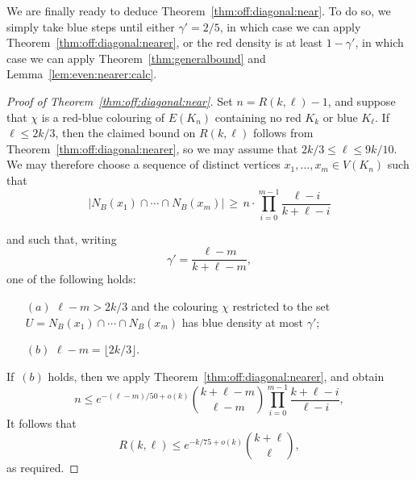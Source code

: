 \documentclass[12pt,reqno]{amsart}
\theoremstyle{definition}
\theoremstyle{remark}
\renewcommand{\le}{\leqslant}
\renewcommand{\ge}{\geqslant}
\begin{document}
We are finally ready to deduce Theorem~\ref{thm:off:diagonal:near}. To do so, we simply take blue steps until either $\gamma' = 2/5$, in which case we can apply Theorem~\ref{thm:off:diagonal:nearer}, or the red density is at least $1 - \gamma'$, in which case we can apply Theorem~\ref{thm:generalbound} and Lemma~\ref{lem:even:nearer:calc}.

\begin{proof}[Proof of Theorem~\ref{thm:off:diagonal:near}]
Set $n = R(k,\ell) - 1$, and suppose that $\chi$ is a red-blue colouring of $E(K_n)$ containing no red $K_k$ or blue $K_\ell$. If $\ell \le 2k/3$, then the claimed bound on $R(k,\ell)$ follows from Theorem~\ref{thm:off:diagonal:nearer}, so we may assume that $2k/3 \le \ell \le 9k/10$. We may therefore choose a sequence of distinct vertices $x_1,\ldots,x_m \in V(K_n)$ such that
\begin{equation}\label{eq:after:ESz:steps}
|N_B(x_1) \cap \cdots \cap N_B(x_m)| \, \ge \, n \cdot \prod_{i = 0}^{m-1} \frac{\ell - i}{k + \ell - i}
\end{equation}

\pagebreak

\noindent and such that, writing 
$$\gamma' = \frac{\ell - m}{k + \ell - m},$$
one of the following holds: \smallskip
\begin{itemize}
\item[$(a)$] $\ell - m > 2k/3$ and the colouring $\chi$ restricted to the set $U = N_B(x_1) \cap \cdots \cap N_B(x_m)$ has blue density at most $\gamma'$;\smallskip
\item[$(b)$] $\ell - m = \lfloor 2k/3 \rfloor$.\smallskip
\end{itemize}

If~$(b)$ holds, then we apply Theorem~\ref{thm:off:diagonal:nearer}, and obtain
$$n \le e^{-(\ell-m)/50 + o(k)} {k + \ell - m \choose \ell - m} \prod_{i = 0}^{m-1} \frac{k + \ell - i}{\ell - i},$$
It follows that
$$R(k,\ell) \le e^{-k/75 + o(k)} {k + \ell \choose \ell},$$
as required.


\end{proof}
\end{document}
